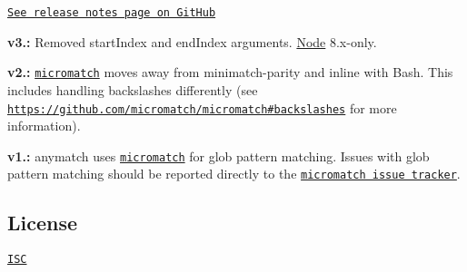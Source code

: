 \href{https://github.com/micromatch/anymatch/releases}{\tt See release notes page on Git\+Hub}


\begin{DoxyItemize}
\item {\bfseries v3.\+:} Removed {\ttfamily start\+Index} and {\ttfamily end\+Index} arguments. \mbox{\hyperlink{classNode}{Node}} 8.\+x-\/only.
\item {\bfseries v2.\+:} \href{https://github.com/jonschlinkert/micromatch}{\tt micromatch} moves away from minimatch-\/parity and inline with Bash. This includes handling backslashes differently (see \href{https://github.com/micromatch/micromatch#backslashes}{\tt https\+://github.\+com/micromatch/micromatch\#backslashes} for more information).
\item {\bfseries v1.\+:} anymatch uses \href{https://github.com/jonschlinkert/micromatch}{\tt micromatch} for glob pattern matching. Issues with glob pattern matching should be reported directly to the \href{https://github.com/jonschlinkert/micromatch/issues}{\tt micromatch issue tracker}.
\end{DoxyItemize}

\subsection*{License }

\href{https://raw.github.com/micromatch/anymatch/master/LICENSE}{\tt I\+SC} 
